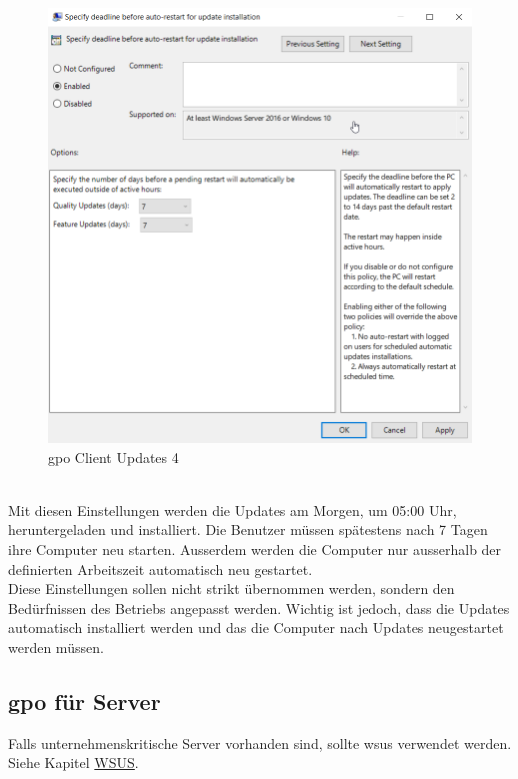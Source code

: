 \begin{minipage}{0.5\linewidth}
    \begin{figure}[H]
        \centering
        \includegraphics[width=\linewidth]{../img/Updates/client-force-restart-deadline.png}
        \caption{\acrshort{gpo} Client Updates 4}
    \end{figure}
\end{minipage}\\

Mit diesen Einstellungen werden die Updates am Morgen, um 05:00 Uhr,  heruntergeladen und installiert.
Die Benutzer müssen spätestens nach 7 Tagen ihre Computer neu starten.
Ausserdem werden die Computer nur ausserhalb der definierten Arbeitszeit automatisch neu gestartet.\\

Diese Einstellungen sollen nicht strikt übernommen werden, sondern den Bedürfnissen des Betriebs angepasst werden.
Wichtig ist jedoch, dass die Updates automatisch installiert werden und das die Computer nach Updates neugestartet werden müssen.

\subsection{\acrshort{gpo} für Server}
Falls unternehmenskritische Server vorhanden sind, sollte \acrfull{wsus} verwendet werden. Siehe Kapitel \hyperref[subsec:wsus]{WSUS}.\\

